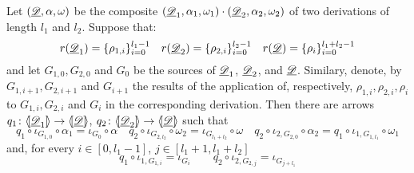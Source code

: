 \begin{lemma}\label{rem:dett}
	Let $(\underline{\mathscr{D}}, \alpha, \omega)$ be the composite $(\underline{\mathscr{D}}_1, \alpha_1, \omega_1)\cdot (\underline{\mathscr{D}}_2, \alpha_2, \omega_2)$ of two derivations of length $l_1$ and $l_2$. Suppose that:
	\[r(\underline{\mathscr{D}}_1)=\{\rho_{1,i}\}_{i=0}^{l_1-1} \quad r(\underline{\mathscr{D}}_2)=\{\rho_{2,i}\}_{i=0}^{l_2-1} \quad  r(\underline{\mathscr{D}})=\{\rho_{i}\}_{i=0}^{l_1+l_2-1}\]
	and let  $G_{1,0}, G_{2,0}$ and $G_{0}$ be the sources of $\underline{\mathscr{D}}_1$, $\underline{\mathscr{D}}_2$,  and $\underline{\mathscr{D}}$. Similary, denote, by $G_{1,i+1}, G_{2,i+1}$ and $G_{i+1}$ the results of the application of, respectively, $\rho_{1,i}, \rho_{2,i}, \rho_i$ to $G_{1,i}, G_{2,i}$ and $G_{i}$  in the corresponding derivation. Then there are arrows $q_1\colon \langle \hspace{-1.85pt}[ \underline{\mathscr{D}}_1]\hspace{-1.85pt}\rangle \to \langle \hspace{-1.85pt}[ \underline{\mathscr{D}}]\hspace{-1.85pt}\rangle$, $q_2\colon \langle \hspace{-1.85pt}[ \underline{\mathscr{D}}_2]\hspace{-1.85pt}\rangle \to \langle \hspace{-1.85pt}[ \underline{\mathscr{D}}]\hspace{-1.85pt}\rangle$ such that
	\[ q_1\circ \iota_{G_{1,0}}\circ \alpha_1 = \iota_{G_{0}}\circ \alpha \quad  q_2\circ \iota_{G_{2,l_2}}\circ \omega_2 = \iota_{G_{l_1+l_2}}\circ \omega \quad 	q_2\circ \iota_{2, G_{2,0}} \circ \alpha_2=q_1\circ \iota_{1, G_{1, l_1}}\circ \omega_1\]
	and, for every $i\in [0, l_1-1]$, $j\in [l_1+1, l_1+l_2]$
	\[q_1\circ \iota_{1, G_{1,i}}=\iota_{G_{i}}\qquad q_2\circ \iota_{2, G_{2,j}}=\iota_{G_{j+l_1}} \]
\end{lemma}
